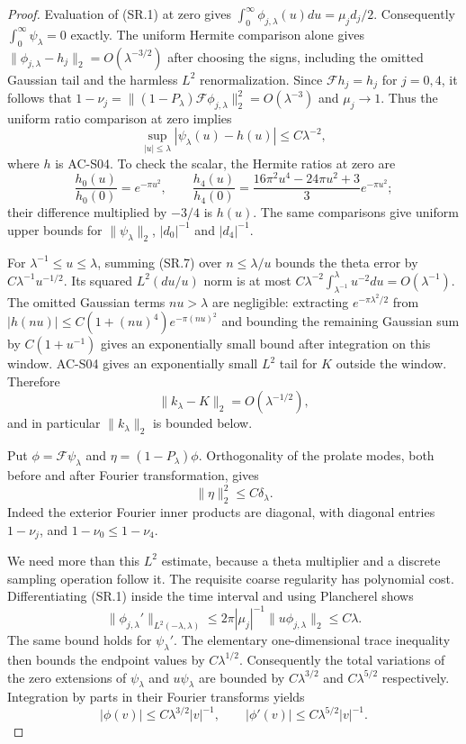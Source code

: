 \begin{proof}
Evaluation of (SR.1) at zero gives
$\int_0^\infty\phi_{j,\lambda}(u)du=\mu_jd_j/2$.
Consequently $\int_0^\infty\psi_\lambda=0$ exactly.
The uniform Hermite comparison alone gives
$\|\phi_{j,\lambda}-h_j\|_2=O(\lambda^{-3/2})$
after choosing the signs, including the omitted Gaussian
tail and the harmless $L^2$ renormalization.
Since $\mathcal Fh_j=h_j$ for $j=0,4$, it follows that
$1-\nu_j=\|(1-P_\lambda)\mathcal F\phi_{j,\lambda}\|_2^2
=O(\lambda^{-3})$ and $\mu_j\to1$.
Thus the uniform ratio comparison at zero implies
\[
 \sup_{|u|\leq\lambda}|\psi_\lambda(u)-h(u)|
                         \leq C\lambda^{-2},       \tag{SR.7}
\]
where $h$ is AC-S04.  To check the scalar, the Hermite
ratios at zero are
\[
 \frac{h_0(u)}{h_0(0)}=e^{-\pi u^2},\qquad
 \frac{h_4(u)}{h_4(0)}=
     \frac{16\pi^2u^4-24\pi u^2+3}{3}e^{-\pi u^2};
\]
their difference multiplied by $-3/4$ is $h(u)$.
The same comparisons give uniform upper bounds for
$\|\psi_\lambda\|_2$, $|d_0|^{-1}$ and $|d_4|^{-1}$.

For $\lambda^{-1}\leq u\leq\lambda$, summing (SR.7)
over $n\leq\lambda/u$ bounds the theta error by
$C\lambda^{-1}u^{-1/2}$.  Its squared $L^2(du/u)$
norm is at most
$C\lambda^{-2}\int_{\lambda^{-1}}^\lambda u^{-2}du
=O(\lambda^{-1})$.
The omitted Gaussian terms $nu>\lambda$ are negligible:
extracting $e^{-\pi\lambda^2/2}$ from
$|h(nu)|\leq C(1+(nu)^4)e^{-\pi(nu)^2}$ and bounding
the remaining Gaussian sum by $C(1+u^{-1})$ gives
an exponentially small bound after integration on this
window.  AC-S04 gives an exponentially small $L^2$
tail for $K$ outside the window.  Therefore
\[
              \|k_\lambda-K\|_2=O(\lambda^{-1/2}),
                                                        \tag{SR.8}
\]
and in particular $\|k_\lambda\|_2$ is bounded below.

Put $\phi=\mathcal F\psi_\lambda$ and
$\eta=(1-P_\lambda)\phi$.
Orthogonality of the prolate modes, both before and
after Fourier transformation, gives
\[
                    \|\eta\|_2^2\leq C\delta_\lambda.
                                                        \tag{SR.9}
\]
Indeed the exterior Fourier inner products are diagonal,
with diagonal entries $1-\nu_j$, and
$1-\nu_0\leq1-\nu_4$.

We need more than this $L^2$ estimate, because a theta
multiplier and a discrete sampling operation follow it.
The requisite coarse regularity has polynomial cost.
Differentiating (SR.1) inside the time interval and
using Plancherel shows
\[
 \|\phi_{j,\lambda}'\|_{L^2(-\lambda,\lambda)}
        \leq2\pi|\mu_j|^{-1}\|u\phi_{j,\lambda}\|_2
        \leq C\lambda.
\]
The same bound holds for $\psi_\lambda'$.
The elementary one-dimensional trace inequality then
bounds the endpoint values by $C\lambda^{1/2}$.
Consequently the total variations of the zero extensions
of $\psi_\lambda$ and $u\psi_\lambda$ are bounded by
$C\lambda^{3/2}$ and $C\lambda^{5/2}$ respectively.
Integration by parts in their Fourier transforms yields
\[
       |\phi(v)|\leq C\lambda^{3/2}|v|^{-1},
 \qquad |\phi'(v)|\leq C\lambda^{5/2}|v|^{-1}.
                                                        \tag{SR.10}
\]


\end{proof}
